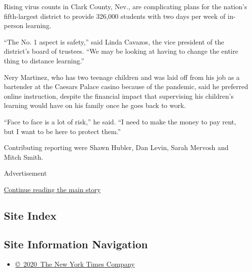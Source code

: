 Rising virus counts in Clark County, Nev., are complicating plans for
the nation's fifth-largest district to provide 326,000 students with two
days per week of in-person learning.

``The No. 1 aspect is safety,'' said Linda Cavazos, the vice president
of the district's board of trustees. ``We may be looking at having to
change the entire thing to distance learning.''

Nery Martinez, who has two teenage children and was laid off from his
job as a bartender at the Caesars Palace casino because of the pandemic,
said he preferred online instruction, despite the financial impact that
supervising his children's learning would have on his family once he
goes back to work.

``Face to face is a lot of risk,'' he said. ``I need to make the money
to pay rent, but I want to be here to protect them.''

Contributing reporting were Shawn Hubler, Dan Levin, Sarah Mervosh and
Mitch Smith.

Advertisement

\protect\hyperlink{after-bottom}{Continue reading the main story}

\hypertarget{site-index}{%
\subsection{Site Index}\label{site-index}}

\hypertarget{site-information-navigation}{%
\subsection{Site Information
Navigation}\label{site-information-navigation}}

\begin{itemize}
\tightlist
\item
  \href{https://help.nytimes3xbfgragh.onion/hc/en-us/articles/115014792127-Copyright-notice}{©~2020~The
  New York Times Company}
\end{itemize}

